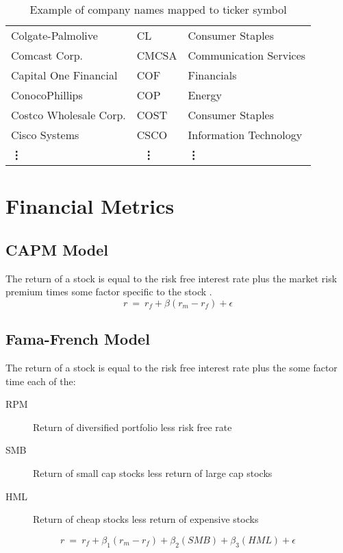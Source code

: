 \begin{table}[p]
\begin{tabular}{@{}lll@{}}
Colgate-Palmolive                 & CL    & Consumer Staples       \\
Comcast Corp.                     & CMCSA & Communication Services \\
Capital One Financial             & COF   & Financials             \\
ConocoPhillips                    & COP   & Energy                 \\
Costco Wholesale Corp.            & COST  & Consumer Staples       \\
Cisco Systems                     & CSCO  & Information Technology \\ 
\multicolumn{1}{l}{\bf \qquad\vdots} & \multicolumn{1}{l}{\bf\ \vdots} & \multicolumn{1}{l}{\bf\qquad\vdots}   \\\bottomrule
\end{tabular}
\caption{Example of company names mapped to ticker symbol}
\label{tab:industries}
\end{table}



\section{Financial Metrics}
\subsection{CAPM Model}\label{sec:capm}
The return of a stock is equal to the risk free interest rate plus the market risk premium times some factor specific to the stock \cite{sharpe1964capital}.
$$r\ =\ r_f + \beta(r_m - r_f) + \epsilon$$
\subsection{Fama-French Model}\label{sec:famaFrench}
The return of a stock \cite{fama1992cross} is equal to the risk free interest rate plus the some factor time each of the:
\begin{description}
	\item[RPM] Return of diversified portfolio less risk free rate
	\item[SMB] Return of small cap stocks less return of large cap stocks
	\item[HML] Return of cheap stocks less return of expensive stocks
\end{description}
$$r\ =\ r_f + \beta_1(r_m - r_f) + \beta_2(SMB) + \beta_3(HML) + \epsilon$$
